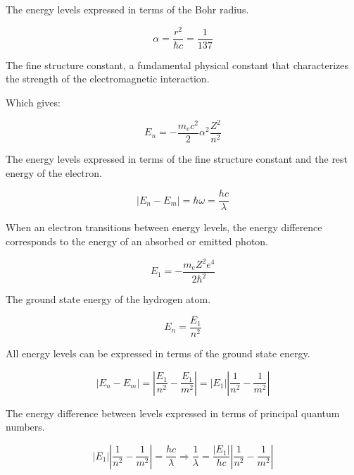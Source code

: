 \documentclass[italian]{HKNdocument}
\begin{document}
The energy levels expressed in terms of the Bohr radius.

\begin{equation}
\alpha=\frac{r^{2}}{\hbar c}=\frac{1}{137}
\end{equation}

The fine structure constant, a fundamental physical constant that characterizes the strength of the electromagnetic interaction.

Which gives:

\begin{equation}
E_{n}=-\frac{m_{e} c^{2}}{2} \alpha^{2} \frac{Z^{2}}{n^{2}}
\end{equation}

The energy levels expressed in terms of the fine structure constant and the rest energy of the electron.

\begin{equation}
\left|E_{n}-E_{m}\right|=\hbar \omega=\frac{h c}{\lambda}
\end{equation}

When an electron transitions between energy levels, the energy difference corresponds to the energy of an absorbed or emitted photon.

\begin{equation}
E_{1}=-\frac{m_{e} Z^{2} e^{4}}{2 \hbar^{2}}
\end{equation}

The ground state energy of the hydrogen atom.

\begin{equation}
E_{n}=\frac{E_{1}}{n^{2}}
\end{equation}

All energy levels can be expressed in terms of the ground state energy.

\begin{equation}
\left|E_{n}-E_{m}\right|=\left|\frac{E_{1}}{n^{2}}-\frac{E_{1}}{m^{2}}\right|=\left|E_{1}\right|\left|\frac{1}{n^{2}}-\frac{1}{m^{2}}\right|
\end{equation}

The energy difference between levels expressed in terms of principal quantum numbers.

\begin{equation}
\left|E_{1}\right|\left|\frac{1}{n^{2}}-\frac{1}{m^{2}}\right|=\frac{h c}{\lambda} \Longrightarrow \frac{1}{\lambda}=\frac{\left|E_{1}\right|}{h c}\left|\frac{1}{n^{2}}-\frac{1}{m^{2}}\right|
\end{equation}
\end{document}
